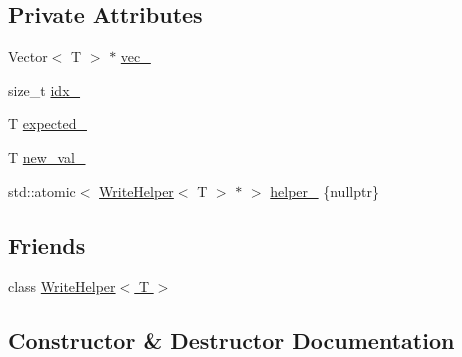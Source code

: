 \subsection*{Private Attributes}
\begin{DoxyCompactItemize}
\item 
Vector$<$ T $>$ $\ast$ \hyperlink{classtervel_1_1containers_1_1wf_1_1vector_1_1_write_op_aad0429090bde2576091caa8ef1713cda}{vec\+\_\+}
\item 
size\+\_\+t \hyperlink{classtervel_1_1containers_1_1wf_1_1vector_1_1_write_op_adeee65a9fa4dbe774d09e29356884ea5}{idx\+\_\+}
\item 
T \hyperlink{classtervel_1_1containers_1_1wf_1_1vector_1_1_write_op_a50dce7c9fe835edf72033b665057bc05}{expected\+\_\+}
\item 
T \hyperlink{classtervel_1_1containers_1_1wf_1_1vector_1_1_write_op_af75188ef94bec379f9fafb55248491f2}{new\+\_\+val\+\_\+}
\item 
std\+::atomic$<$ \hyperlink{classtervel_1_1containers_1_1wf_1_1vector_1_1_write_helper}{Write\+Helper}$<$ T $>$ $\ast$ $>$ \hyperlink{classtervel_1_1containers_1_1wf_1_1vector_1_1_write_op_ab1239b5ef9dfcabbd9bb4626b036fb3b}{helper\+\_\+} \{nullptr\}
\end{DoxyCompactItemize}
\subsection*{Friends}
\begin{DoxyCompactItemize}
\item 
class \hyperlink{classtervel_1_1containers_1_1wf_1_1vector_1_1_write_op_a9f30cc5e47d15bd8dd0d486bb2dd026b}{Write\+Helper$<$ T $>$}
\end{DoxyCompactItemize}


\subsection{Constructor \& Destructor Documentation}
\hypertarget{classtervel_1_1containers_1_1wf_1_1vector_1_1_write_op_a09e0c8cc62247a95e50e43a482df81fe}{}
